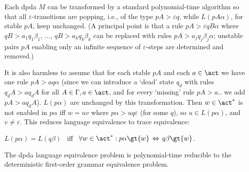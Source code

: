 \documentclass[12pt]{article}
\begin{document}
Each dpda $M$ can be transformed by a standard polynomial-time
algorithm so that
all $\varepsilon$-transitions  are popping, i.e., of the type
$pA\gt{\varepsilon}q$, while  
$L(pA\alpha)$, for stable $pA$, keep unchanged.
(A principal point is that 
a rule $pA\gt{\varepsilon}qB\alpha$ where $qB\gt{a_1}q_1\beta_1$,
$\dots$,  $qB\gt{a_k}q_k\beta_k$ can be
replaced with rules $pA\gt{a_j}q_j\beta_j\alpha$; unstable pairs
$pA$ enabling only an infinite sequence of $\varepsilon$-steps are
determined and removed.) 

It is also harmless to assume that for each stable $pA$ and each
$a\in\act$ we have one rule $pA\gt{a}q\alpha$ 
(since we can introduce a `dead' state $q_d$ with rules $q_dA\gt{a}q_dA$
for all $A\in \Gamma, a\in\act$, and for every 
`missing' rule $pA\gt{a}..$ we add  $pA\gt{a}q_dA$). 
$L(p\alpha)$ are unchanged by this transformation.
Then  $w\in \act^*$ is not enabled in $p\alpha$ iff $w=uv$ where
$p\alpha\gt{u}q\varepsilon$ (for some $q$), so $u\in L(p\alpha)$, and
$v\neq\varepsilon$.
This reduces language equivalence to trace equivalence:
\begin{center}
$L(p\alpha)=L(q\beta)$ \ iff
\  $\forall w\in\act^*:p\alpha\gt{w}\,\Leftrightarrow\,q\beta\gt{w}$.
\end{center}


\begin{prop} \label{dpdaprop}
The dpda language equivalence problem 
is polynomial-time reducible 
to the deterministic first-order grammar 
equivalence problem.
\end{prop}
\end{document}
